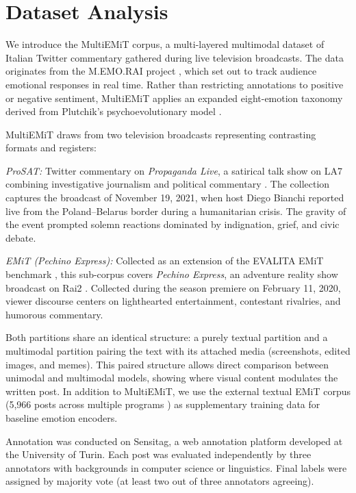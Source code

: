 \section{Dataset Analysis}
\label{sec:dataset_analysis}

We introduce the MultiEMiT corpus, a multi-layered multimodal dataset of Italian Twitter commentary gathered during live television broadcasts. The data originates from the M.EMO.RAI project \cite{memorai}, which set out to track audience emotional responses in real time. Rather than restricting annotations to positive or negative sentiment, MultiEMiT applies an expanded eight-emotion taxonomy derived from Plutchik's psychoevolutionary model \cite{Plutchik}.

MultiEMiT draws from two television broadcasts representing contrasting formats and registers:

\textit{ProSAT:} Twitter commentary on \textit{Propaganda Live}, a satirical talk show on LA7 combining investigative journalism and political commentary \cite{propagandalive}. The collection captures the broadcast of November 19, 2021, when host Diego Bianchi reported live from the Poland--Belarus border during a humanitarian crisis. The gravity of the event prompted solemn reactions dominated by indignation, grief, and civic debate.

\textit{EMiT (Pechino Express):} Collected as an extension of the EVALITA EMiT benchmark \cite{emit}, this sub-corpus covers \textit{Pechino Express}, an adventure reality show broadcast on Rai2 \cite{pechinoexpress}. Collected during the season premiere on February 11, 2020, viewer discourse centers on lighthearted entertainment, contestant rivalries, and humorous commentary.

Both partitions share an identical structure: a purely textual partition and a multimodal partition pairing the text with its attached media (screenshots, edited images, and memes). This paired structure allows direct comparison between unimodal and multimodal models, showing where visual content modulates the written post. In addition to MultiEMiT, we use the external textual EMiT corpus (5,966 posts across multiple programs \cite{emit}) as supplementary training data for baseline emotion encoders.

Annotation was conducted on Sensitag, a web annotation platform developed at the University of Turin. Each post was evaluated independently by three annotators with backgrounds in computer science or linguistics. Final labels were assigned by majority vote (at least two out of three annotators agreeing).

